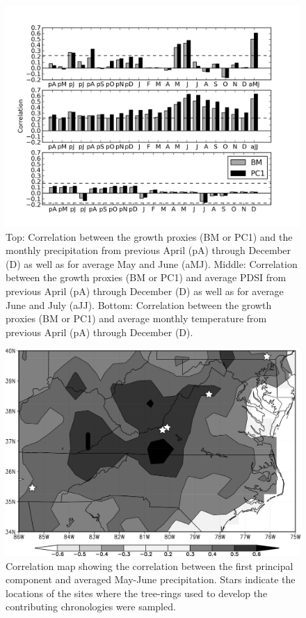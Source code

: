 \begin{figure}
\centering
\includegraphics[width=5in]{figures/climCorr2.png}
\caption{Top: Correlation between the growth proxies (BM or PC1) and the monthly precipitation from previous April (pA) through December (D) as well as for average May and June (aMJ). Middle: Correlation between the growth proxies (BM or PC1) and average PDSI from previous April (pA) through December (D) as well as for average June and July (aJJ). Bottom: Correlation between the growth proxies (BM or PC1) and average monthly temperature from previous April (pA) through December (D).}
\label{fig:climCorr}
\end{figure}

\begin{figure}
\centering
\includegraphics[width=5in]{figures/corrMapPrecipMJ_bw_annot.png}
\caption{Correlation map showing the correlation between the first principal component and averaged May-June precipitation. Stars indicate the locations of the sites where the tree-rings used to develop the contributing chronologies were sampled.}
\label{fig:precipCorrMap}
\end{figure}

